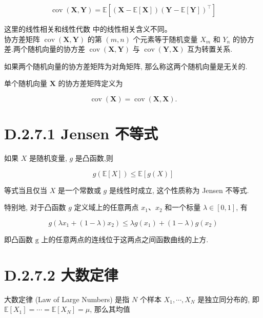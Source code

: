 \documentclass[10pt]{article}
\begin{document}
\begin{equation*}
\operatorname{cov}(\boldsymbol{X}, \boldsymbol{Y})=\mathbb{E}\left[(\boldsymbol{X}-\mathbb{E}[\boldsymbol{X}])(\boldsymbol{Y}-\mathbb{E}[\boldsymbol{Y}])^{\top}\right] \tag{D.39}
\end{equation*}


这里的线性相关和线性代数 中的线性相关含义不同。\\
协方差矩阵 $\operatorname{cov}(\boldsymbol{X}, \boldsymbol{Y})$ 的第 $(m, n)$ 个元素等于随机变量 $X_{m}$ 和 $Y_{n}$ 的协方差.两个随机向量的协方差 $\operatorname{cov}(\boldsymbol{X}, \boldsymbol{Y})$ 与 $\operatorname{cov}(\boldsymbol{Y}, \boldsymbol{X})$ 互为转置关系.

如果两个随机向量的协方差矩阵为对角矩阵, 那么称这两个随机向量是无关的.

单个随机向量 $\boldsymbol{X}$ 的协方差矩阵定义为


\begin{equation*}
\operatorname{cov}(\boldsymbol{X})=\operatorname{cov}(\boldsymbol{X}, \boldsymbol{X}) . \tag{D.40}
\end{equation*}


\section*{D.2.7.1 Jensen 不等式}
如果 $X$ 是随机变量, $g$ 是凸函数,则


\begin{equation*}
g(\mathbb{E}[X]) \leq \mathbb{E}[g(X)] \tag{D.41}
\end{equation*}


等式当且仅当 $X$ 是一个常数或 $g$ 是线性时成立, 这个性质称为 Jensen 不等式.

特别地, 对于凸函数 $g$ 定义域上的任意两点 $x_{1} 、 x_{2}$ 和一个标量 $\lambda \in[0,1]$, 有


\begin{equation*}
g\left(\lambda x_{1}+(1-\lambda) x_{2}\right) \leq \lambda g\left(x_{1}\right)+(1-\lambda) g\left(x_{2}\right) \tag{D.42}
\end{equation*}


即凸函数 $\mathrm{g}$ 上的任意两点的连线位于这两点之间函数曲线的上方.

\section*{D.2.7.2 大数定律}
大数定律 (Law of Large Numbers) 是指 $N$ 个样本 $X_{1}, \cdots, X_{N}$ 是独立同分布的, 即 $\mathbb{E}\left[X_{1}\right]=\cdots=\mathbb{E}\left[X_{N}\right]=\mu$, 那么其均值
\end{document}
